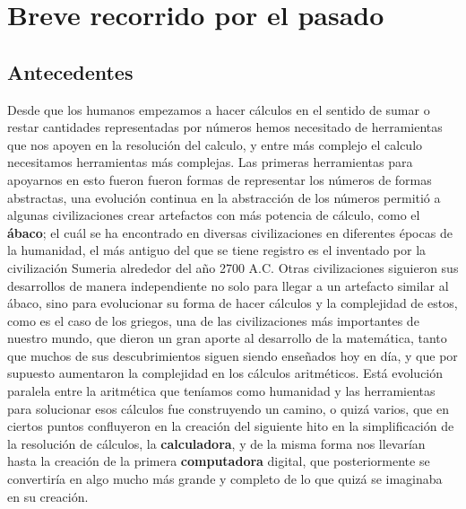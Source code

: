 \documentclass[letterpaper,12pt,oneside]{book}
\begin{document}
	\section{Breve recorrido por el pasado}
		\subsection{Antecedentes}
		
		Desde que los humanos empezamos a hacer cálculos en el sentido de sumar o restar cantidades representadas por números hemos necesitado de herramientas
		que nos apoyen en la resolución del calculo, y entre más complejo el calculo necesitamos herramientas más complejas. Las
		primeras herramientas para apoyarnos en esto fueron fueron formas de representar los números de formas abstractas, una evolución continua en la abstracción
		de los números permitió a algunas civilizaciones crear artefactos con más potencia de cálculo, como el \textbf{ábaco}; el cuál se ha encontrado
		en diversas civilizaciones en diferentes épocas de la humanidad, el más antiguo del que se tiene registro es el inventado por la civilización
		Sumeria alrededor del año 2700 A.C. Otras civilizaciones siguieron sus desarrollos de manera independiente no solo para llegar a un artefacto
		similar al ábaco, sino para evolucionar su forma de hacer cálculos y la complejidad de estos, como es el caso de los griegos, una de las civilizaciones
		más importantes de nuestro mundo, que dieron un gran aporte al desarrollo de la matemática, tanto que muchos de sus descubrimientos siguen siendo
		enseñados hoy en día, y que por supuesto aumentaron la complejidad en los cálculos aritméticos. Está evolución paralela entre la aritmética que teníamos como humanidad 
		y las herramientas para solucionar esos cálculos
		fue construyendo un camino, o quizá varios, que en ciertos puntos confluyeron en la creación del siguiente hito en la simplificación de la resolución
		de cálculos, la \textbf{calculadora}, y de la misma forma nos llevarían hasta la creación de la primera \textbf{computadora} digital, que posteriormente se convertiría
		en algo mucho más grande y completo de lo que quizá se imaginaba en su creación\cite{ifrah_universal_2001}.
		
\end{document}
